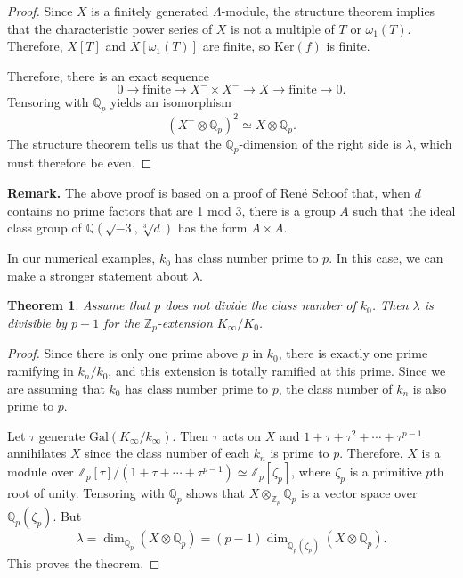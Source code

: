 \documentclass{amsart}
\newtheorem{theorem}{Theorem}
\begin{document}
\begin{proof}
Since $X$ is a finitely generated $\Lambda$-module, the structure theorem implies that the characteristic power
series of $X$ is not a multiple of $T$ or $\omega_1(T)$. Therefore, $X[T]$ and $X[\omega_1(T)]$ are finite, 
so $\text{Ker}(f)$ is finite.

Therefore, there is an exact sequence
$$
0\to \text{finite} \to X^-\times X^-\to X\to \text{finite} \to 0.
$$
Tensoring with $\mathbb Q_p$ yields an isomorphism
$$
\left(X^-\otimes \mathbb Q_p\right)^2 \simeq X\otimes \mathbb Q_p.$$
The structure theorem tells us that the $\mathbb Q_p$-dimension of the right side is $\lambda$, which must therefore
be even. \end{proof}

{\bf Remark.} The above proof is based on a proof of Ren\'e Schoof \cite{Schoof}
that, when $d$ contains no prime factors that are 1 mod 3, there is a group $A$ such that the ideal class group
of $\mathbb Q(\sqrt{-3}, \sqrt[3]{d})$ has the form $A\times A$.

\medskip

In our numerical examples, $k_0$ has class number prime to $p$. In this case, we can make a stronger statement about $\lambda$.
\begin{theorem}\label{LambdaEvenMore} Assume that $p$ does not divide the class number of $k_0$. Then $\lambda$
is divisible by $p-1$ for the $\mathbb Z_p$-extension $K_{\infty}/K_0$. 
\end{theorem}
\begin{proof} Since there is only one prime above $p$ in $k_0$, there is exactly one prime ramifying in $k_n/k_0$, 
and this extension is totally ramified at this prime. Since we are assuming that $k_0$ has class number prime to $p$, 
the class number of $k_n$ is also prime to $p$.

 Let $\tau$ generate $\text{Gal}(K_{\infty}/k_{\infty})$. Then $\tau$ acts on $X$ and $1+\tau+\tau^2+\cdots +\tau^{p-1}$
annihilates $X$ since the class number of each $k_n$ is prime to $p$.
Therefore, $X$ is a module over $\mathbb Z_p[\tau]/(1+\tau+\cdots +\tau^{p-1})\simeq \mathbb Z_p[\zeta_p]$,
where $\zeta_p$ is a primitive $p$th root of unity. Tensoring with $\mathbb Q_p$ shows that
$X\otimes_{\mathbb Z_p} \mathbb Q_p$ is a vector space over $\mathbb Q_p(\zeta_p)$. But
$$
\lambda = \dim_{\mathbb Q_p} \left(X\otimes \mathbb Q_p\right) = (p-1) \dim_{\mathbb Q_p(\zeta_p)}
\left(X\otimes \mathbb Q_p\right).
$$
This proves the theorem.\end{proof}
\end{document}
